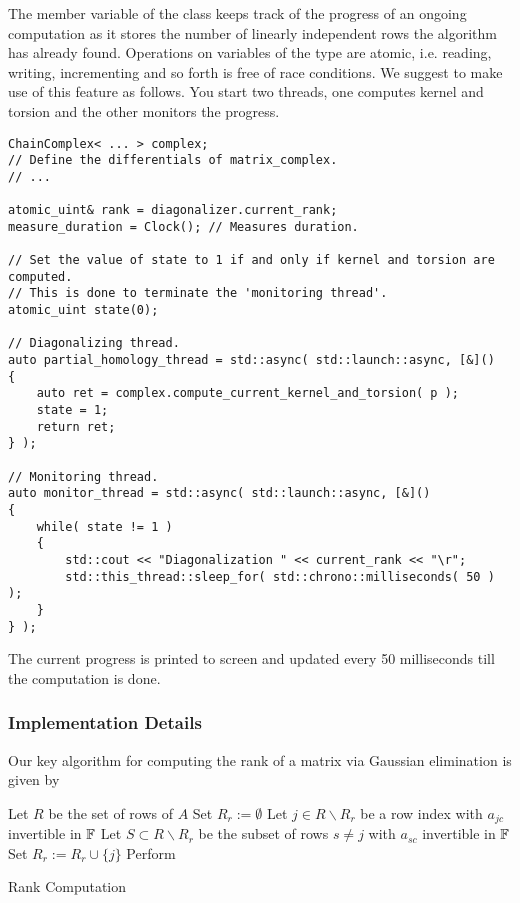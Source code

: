 The member variable  of the class  keeps track of the progress of an ongoing computation as
it stores the number of linearly independent rows the algorithm has already found.
Operations on variables of the type  are atomic, i.e. reading, writing, incrementing and so forth is free of race conditions.
We suggest to make use of this feature as follows.
You start two threads, one computes kernel and torsion and the other monitors the progress.
\begin{lstlisting}
ChainComplex< ... > complex;
// Define the differentials of matrix_complex.
// ...

atomic_uint& rank = diagonalizer.current_rank;
measure_duration = Clock(); // Measures duration.

// Set the value of state to 1 if and only if kernel and torsion are computed.
// This is done to terminate the 'monitoring thread'.
atomic_uint state(0);

// Diagonalizing thread.
auto partial_homology_thread = std::async( std::launch::async, [&]()
{
    auto ret = complex.compute_current_kernel_and_torsion( p );
    state = 1;
    return ret;
} );

// Monitoring thread.
auto monitor_thread = std::async( std::launch::async, [&]()
{
    while( state != 1 )
    {
        std::cout << "Diagonalization " << current_rank << "\r";
        std::this_thread::sleep_for( std::chrono::milliseconds( 50 ) );
    }
} );
\end{lstlisting}
The current progress is printed to screen and updated every 50 milliseconds till the computation is done.

\subsubsection{Implementation Details}
\label{diag_field_implementation}
Our key algorithm for computing the rank of a matrix via Gaussian elimination is given by

\begin{algorithm}[H]
\label{rank}
\DontPrintSemicolon
{}

Let $R$ be the set of rows of $A$\;
Set $R_r := \emptyset$ \;
{
	Let $j \in R \backslash R_r$ be a row index with $a_{jc}$ invertible in $\mathbb F$\;
	{
		\KwCont\;
	}
	Let $S \subset R \backslash R_r$ be the subset of rows $s \neq j$ with $a_{sc}$ invertible in $\mathbb F$\;
	{
		Set $R_r := R_r \cup \{j\}$\;
	}
	{
		Perform \;
	}
}

\caption{Rank Computation}

\end{algorithm}

